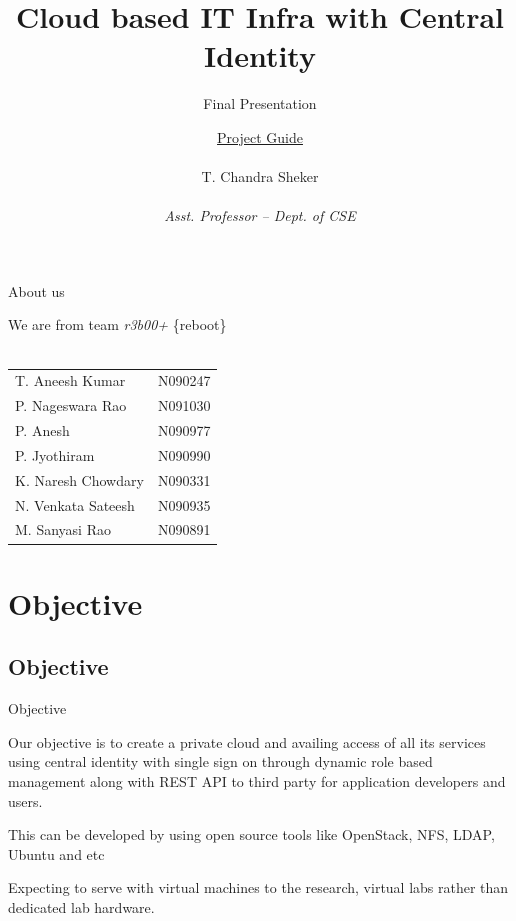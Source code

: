 \documentclass[10pt,xcolor=dvipsnames]{beamer}
\title[Cloud based IT Infra with Central Identity]{Cloud based IT Infra with Central Identity}
\subtitle{Final Presentation}
\author{ \underline{Project Guide} \\ \hspace{2mm} \\ \small{ T. Chandra Sheker } \tiny \\ \underline{} \\ \scriptsize \textit{Asst. Professor -- Dept. of CSE} }
\institute{ \underline{Presenting by} \\ \hspace{2mm} \\ \textit {Team r3b00+ }  \\ \hspace{4mm} \\ Dept. of CSE, RGUKT -- Nuzvid}
\begin{document}
\begin{frame}
\titlepage
\end{frame}


\begin{frame}{About us}

\small
\begin{center}
We are from team \textit{r3b00+}  \{reboot\} \\ \hspace{4cm} \\
\begin{tabular}{l  l }
T. Aneesh Kumar & N090247   \\
P. Nageswara Rao  & N091030  \\
P. Anesh  & N090977 \\
P. Jyothiram & N090990 \\
K. Naresh Chowdary  & N090331 \\
N. Venkata Sateesh  & N090935 \\
M. Sanyasi Rao & N090891  
\end{tabular}


\end{center}


\end{frame}
 

\section{Objective}
\subsection{Objective}
\begin{frame}{Objective}

Our objective is to create a  private cloud and availing access of all its services using central identity with single sign on through dynamic role based management along with REST API to third party for application developers and users. \newline

This can be developed by using open source tools like OpenStack, NFS, LDAP, Ubuntu and etc \newline

Expecting to serve with virtual machines to the research, virtual labs rather than dedicated lab hardware.
\end{frame}
\end{document}
